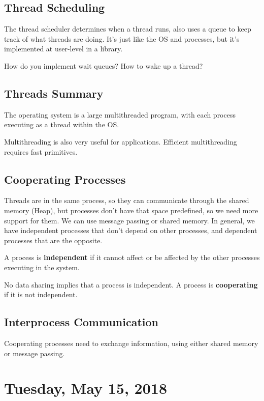 \documentclass{article}
\begin{document}
\subsection{Thread Scheduling}

The thread scheduler determines when a thread runs, also uses a queue to keep track of what threads are doing. It's just like the OS and processes, but it's implemented at user-level in a library.

How do you implement wait queues? How to wake up a thread?

\subsection{Threads Summary}

The operating system is a large multithreaded program, with each process executing as a thread within the OS.

Multithreading is also very useful for applications. Efficient multithreading requires fast primitives.

\subsection{Cooperating Processes}

Threads are in the same process, so they can communicate through the shared memory (Heap), but processes don't have that space predefined, so we need more support for them. We can use message passing or shared memory. In general, we have independent processes that don't depend on other processes, and dependent processes that are the opposite.

A process is \textbf{independent} if it cannot affect or be affected by the other processes executing in the system.

No data sharing implies that a process is independent. A process is \textbf{cooperating} if it is not independent.

\subsection{Interprocess Communication}

Cooperating processes need to exchange information, using either shared memory or message passing.

\newpage

\section{Tuesday, May 15, 2018}
\end{document}
